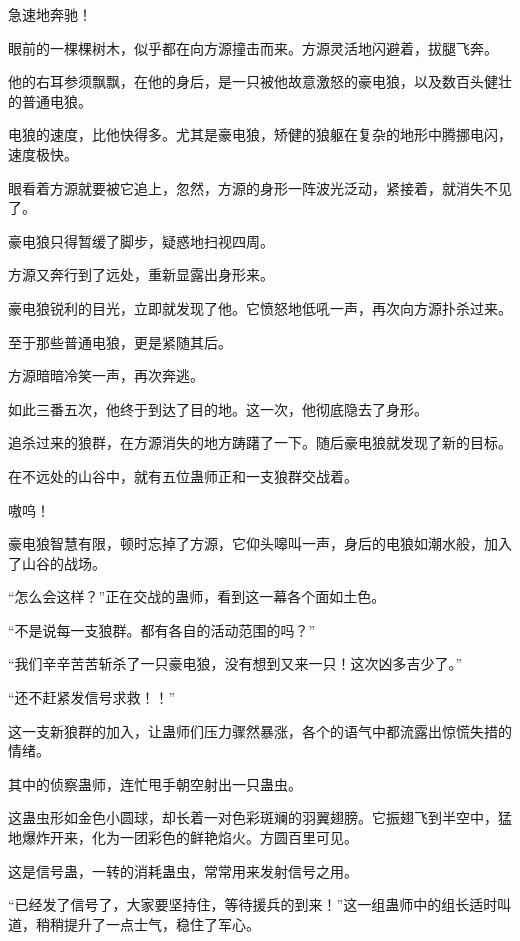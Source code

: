 
\begin{this_body}



急速地奔驰！

眼前的一棵棵树木，似乎都在向方源撞击而来。方源灵活地闪避着，拔腿飞奔。

他的右耳参须飘飘，在他的身后，是一只被他故意激怒的豪电狼，以及数百头健壮的普通电狼。

电狼的速度，比他快得多。尤其是豪电狼，矫健的狼躯在复杂的地形中腾挪电闪，速度极快。

眼看着方源就要被它追上，忽然，方源的身形一阵波光泛动，紧接着，就消失不见了。

豪电狼只得暂缓了脚步，疑惑地扫视四周。

方源又奔行到了远处，重新显露出身形来。

豪电狼锐利的目光，立即就发现了他。它愤怒地低吼一声，再次向方源扑杀过来。

至于那些普通电狼，更是紧随其后。

方源暗暗冷笑一声，再次奔逃。

如此三番五次，他终于到达了目的地。这一次，他彻底隐去了身形。

追杀过来的狼群，在方源消失的地方踌躇了一下。随后豪电狼就发现了新的目标。

在不远处的山谷中，就有五位蛊师正和一支狼群交战着。

嗷呜！

豪电狼智慧有限，顿时忘掉了方源，它仰头嗥叫一声，身后的电狼如潮水般，加入了山谷的战场。

“怎么会这样？”正在交战的蛊师，看到这一幕各个面如土色。

“不是说每一支狼群。都有各自的活动范围的吗？”

“我们辛辛苦苦斩杀了一只豪电狼，没有想到又来一只！这次凶多吉少了。”

“还不赶紧发信号求救！！”

这一支新狼群的加入，让蛊师们压力骤然暴涨，各个的语气中都流露出惊慌失措的情绪。

其中的侦察蛊师，连忙甩手朝空射出一只蛊虫。

这蛊虫形如金色小圆球，却长着一对色彩斑斓的羽翼翅膀。它振翅飞到半空中，猛地爆炸开来，化为一团彩色的鲜艳焰火。方圆百里可见。

这是信号蛊，一转的消耗蛊虫，常常用来发射信号之用。

“已经发了信号了，大家要坚持住，等待援兵的到来！”这一组蛊师中的组长适时叫道，稍稍提升了一点士气，稳住了军心。


\end{this_body}
